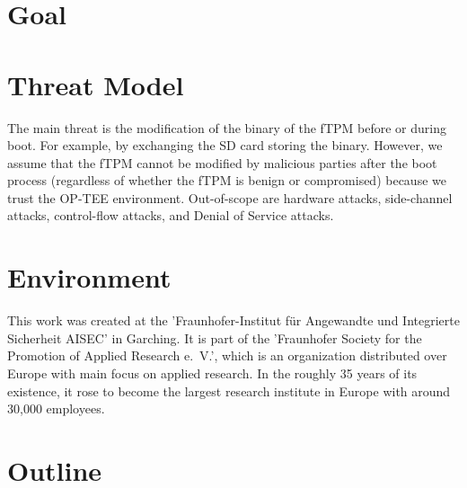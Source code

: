 
\section{Goal}
\section{Threat Model}

The main threat is the modification of the binary of the fTPM before or during boot. For example, by exchanging the SD card storing the binary.
However, we assume that the fTPM cannot be modified by malicious parties after the boot process (regardless of whether the fTPM is benign or compromised) because we trust the OP-TEE environment.
Out-of-scope are hardware attacks, side-channel attacks, control-flow attacks, and Denial of Service attacks.



\section{Environment}

This work was created at the 'Fraunhofer-Institut für Angewandte und Integrierte Sicherheit AISEC' in Garching.
It is part of the 'Fraunhofer Society for the Promotion of Applied Research e.~V.', which is an organization distributed over Europe with main focus on applied research.
In the roughly 35 years of its existence, it rose to become the largest research institute in Europe with around 30,000 employees.

\section{Outline}
